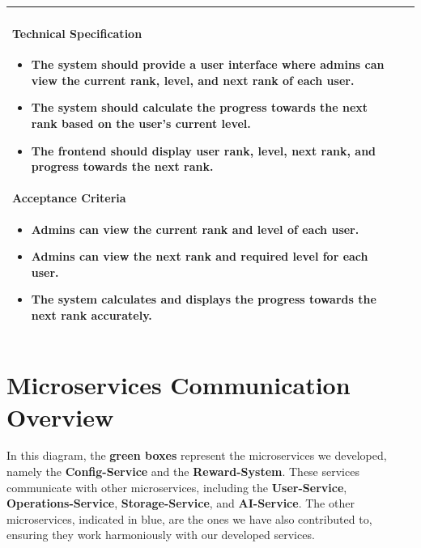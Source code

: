 \begin{longtable}{ | m{} | m{} | }
    \paragraph*{Technical Specification} \mbox{} \newline
    \begin{itemize}
        \item The system should provide a user interface where admins can view the current rank, level, and next rank of each user.
        \item The system should calculate the progress towards the next rank based on the user's current level.
        \item The frontend should display user rank, level, next rank, and progress towards the next rank.
    \end{itemize}
    
    \paragraph*{Acceptance Criteria} \mbox{} \newline
    \begin{itemize}
        \item Admins can view the current rank and level of each user.
        \item Admins can view the next rank and required level for each user.
        \item The system calculates and displays the progress towards the next rank accurately.
    \end{itemize}                                                                                                                                                      \\
    \hline
\end{longtable}

\section{Microservices Communication Overview}
In this diagram, the \textbf{\textcolor[rgb]{0.0,0.5,0.0}{green boxes}} represent the microservices we developed, namely the \textbf{Config-Service} and the \textbf{Reward-System}. These services communicate with other microservices, including the \textbf{\textcolor[rgb]{0.0,0.0,0.5}{User-Service}}, \textbf{\textcolor[rgb]{0.0,0.0,0.5}{Operations-Service}}, \textbf{\textcolor[rgb]{0.0,0.0,0.5}{Storage-Service}}, and \textbf{\textcolor[rgb]{0.0,0.0,0.5}{AI-Service}}. The other microservices, indicated in blue, are the ones we have also contributed to, ensuring they work harmoniously with our developed services.


